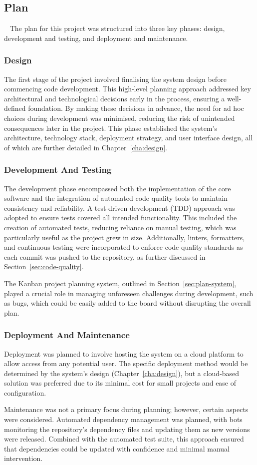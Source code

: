 \subsection{Plan}~\label{sec:plan}
The plan for this project was structured into three key phases: design, development and testing, and deployment and maintenance.

\subsubsection{Design}
The first stage of the project involved finalising the system design before commencing code development. This high-level planning approach addressed key architectural and technological decisions early in the process, ensuring a well-defined foundation. By making these decisions in advance, the need for ad hoc choices during development was minimised, reducing the risk of unintended consequences later in the project. This phase established the system's architecture, technology stack, deployment strategy, and user interface design, all of which are further detailed in Chapter~\ref{cha:design}.

\subsubsection{Development And Testing}
The development phase encompassed both the implementation of the core software and the integration of automated code quality tools to maintain consistency and reliability. A test-driven development (TDD) approach was adopted to ensure tests covered all intended functionality. This included the creation of automated tests, reducing reliance on manual testing, which was particularly useful as the project grew in size. Additionally, linters, formatters, and continuous testing were incorporated to enforce code quality standards as each commit was pushed to the repository, as further discussed in Section~\ref{sec:code-quality}.

The Kanban project planning system, outlined in Section~\ref{sec:plan-system}, played a crucial role in managing unforeseen challenges during development, such as bugs, which could be easily added to the board without disrupting the overall plan.

\subsubsection{Deployment And Maintenance}
Deployment was planned to involve hosting the system on a cloud platform to allow access from any potential user. The specific deployment method would be determined by the system’s design (Chapter~\ref{cha:design}), but a cloud-based solution was preferred due to its minimal cost for small projects and ease of configuration.

Maintenance was not a primary focus during planning; however, certain aspects were considered. Automated dependency management was planned, with bots monitoring the repository’s dependency files and updating them as new versions were released. Combined with the automated test suite, this approach ensured that dependencies could be updated with confidence and minimal manual intervention.
